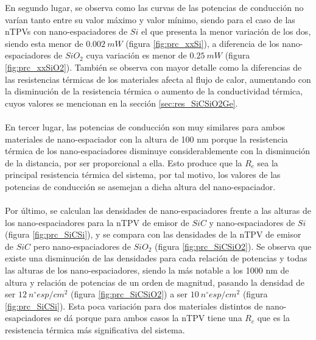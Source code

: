 En segundo lugar, se observa como las curvas de las potencias de conducción no varían tanto entre su valor máximo y valor mínimo, siendo para el caso de las nTPVs con nano-espaciadores de $Si$ el que presenta la menor variación de los dos, siendo esta menor de $0.002 \ mW$ (figura \ref{fig:prc_xxSi}), a diferencia de los nano-espaciadores de $SiO_2$ cuya variación es menor de $0.25 \ mW$ (figura \ref{fig:prc_xxSiO2}). También se observa con mayor detalle como la diferencias de las resistencias térmicas de los materiales afecta al flujo de calor, aumentando con la disminución de la resistencia térmica o aumento de la conductividad térmica, cuyos valores se mencionan en la sección \ref{sec:res_SiCSiO2Ge}.\\\\
En tercer lugar, las potencias de conducción son muy similares para ambos materiales de nano-espaciador con la altura de 100 nm porque la resistencia térmica de los nano-espaciadores disminuye considerablemente con la disminución de la distancia, por ser proporcional a ella. Esto produce que la $R_c$ sea la principal resistencia térmica del sistema, por tal motivo, los valores de las potencias de conducción se asemejan a dicha altura del nano-espaciador.\\\\
Por último, se calculan las densidades de nano-espaciadores frente a las alturas de los nano-espaciadores para la nTPV de emisor de $SiC$ y nano-espaciadores de $Si$ (figura \ref{fig:prc_SiCSi}), y se compara con las densidades de la nTPV de emisor de $SiC$ pero nano-espaciadores de $SiO_2$ (figura \ref{fig:prc_SiCSiO2}). Se observa que existe una disminución de las densidades para cada relación de potencias y todas las alturas de los nano-espaciadores, siendo la más notable a los 1000 nm de altura y relación de potencias de un orden de magnitud, pasando la densidad de ser $12 \ n^{\circ}esp/cm^2$ (figura \ref{fig:prc_SiCSiO2}) a ser $10 \ n^{\circ}esp/cm^2$ (figura \ref{fig:prc_SiCSi}). Esta poca variación para dos materiales distintos de nano-esapciadores se dá porque para ambos casos la nTPV tiene una $R_c$ que es la resistencia térmica más significativa del sistema.
